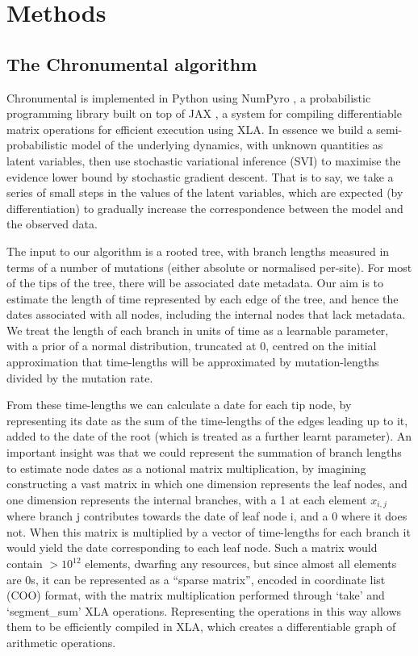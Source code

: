 \section*{Methods}

\subsection*{The Chronumental algorithm}

Chronumental is implemented in Python using NumPyro \citep{phan2019composable}, a probabilistic programming library built on top of JAX \citep{jax2018github}, a system for compiling differentiable matrix operations for efficient execution using XLA. In essence we build a semi-probabilistic model of the underlying dynamics, with unknown quantities as latent variables, then use stochastic variational inference (SVI) to maximise the evidence lower bound by stochastic gradient descent. That is to say, we take a series of small steps in the values of the latent variables, which are expected (by differentiation) to gradually increase the correspondence between the model and the observed data.

The input to our algorithm is a rooted tree, with branch lengths measured in terms of a number of mutations (either absolute or normalised per-site). For most of the tips of the tree, there will be associated date metadata. Our aim is to estimate the length of time represented by each edge of the tree, and hence the dates associated with all nodes, including the internal nodes that lack metadata. We treat the length of each branch in units of time as a learnable parameter, with a prior of a normal distribution, truncated at 0, centred on the initial approximation that time-lengths will be approximated by mutation-lengths divided by the mutation rate. 

From these time-lengths we can calculate a date for each tip node, by representing its date as the sum of the time-lengths of the edges leading up to it, added to the date of the root (which is treated as a further learnt parameter). An important insight was that we could represent the summation of branch lengths to estimate node dates as a notional matrix multiplication, by imagining constructing a vast matrix in which one dimension represents the leaf nodes, and one dimension represents the internal branches, with a 1 at each element $x_{i,j}$ where branch j contributes towards the date of leaf node i, and a 0 where it does not. When this matrix is multiplied by a vector of time-lengths for each branch it would yield the date corresponding to each leaf node.  Such a matrix would contain $>10^{12}$ elements, dwarfing any resources, but since almost all elements are 0s, it can be represented as a ``sparse matrix'', encoded in coordinate list (COO) format, with the matrix multiplication performed through `take' and `segment\_sum' XLA operations. Representing the operations in this way allows them to be efficiently compiled in XLA, which creates a differentiable graph of arithmetic operations. 


